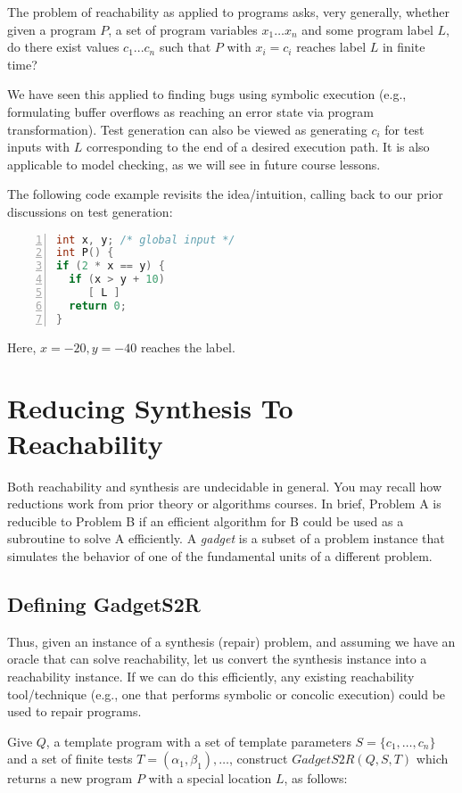 \documentclass[11pt]{article}
\begin{document}
The problem of reachability as applied to programs asks, very generally, whether
given a program $P$, a set of program variables $x_1 \ldots x_n$ and some
program label $L$, do there exist values $c_1 ... c_n$ such that $P$ with
$x_i = c_i$ reaches label $L$ in finite time?

We have seen this applied to finding bugs using symbolic execution (e.g.,
formulating buffer overflows as reaching an error state via program
transformation). Test generation can also be viewed as generating $c_i$ for test
inputs with $L$ corresponding to the end of a desired execution path. It is also
applicable to model checking, as we will see in future course lessons.

The following code example revisits the idea/intuition, calling back to our
prior discussions on test generation:

\begin{lstlisting}[language=C,basicstyle=\footnotesize,numbers=left]
int x, y; /* global input */
int P() { 
if (2 * x == y) {
  if (x > y + 10) 
     [ L ]
  return 0;
}
\end{lstlisting}

Here, $x = -20, y=-40$ reaches the label. 

\section{Reducing Synthesis To Reachability}

Both reachability and synthesis are undecidable in general. You may recall how
reductions work from prior theory or algorithms courses. In brief, Problem A is
reducible to Problem B if an efficient algorithm for B could be used as a
subroutine to solve A efficiently. A \emph{gadget} is a subset of a problem
instance that simulates the behavior of one of the fundamental units of a
different problem.


\subsection{Defining GadgetS2R}
Thus, given an instance of a synthesis (repair) problem, and assuming we have an
oracle that can solve reachability, let us convert the synthesis instance into a
reachability instance. If we can do this efficiently, any existing reachability
tool/technique (e.g., one that performs symbolic or concolic execution) could be
used to repair programs.

Give $Q$, a template program with a set of template parameters $S = \{ c_1,
\ldots, c_n\}$ and a set of finite tests $T = {(\alpha_1,\beta_1), \ldots}$,
  construct $GadgetS2R(Q,S,T)$ which returns a new program $P$ with a special
  location $L$, as follows:
\end{document}
